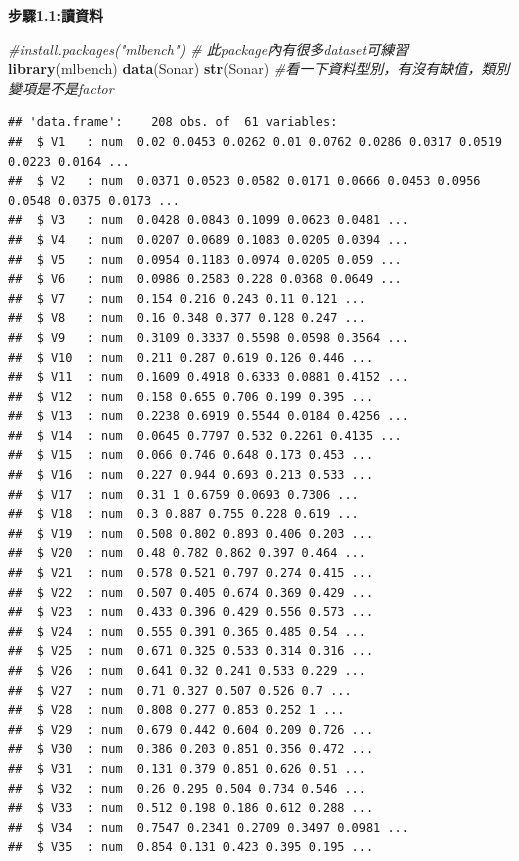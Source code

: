\documentclass[]{book}
\newenvironment{Shaded}{\begin{snugshade}}{\end{snugshade}}
\newcommand{\CommentTok}[1]{\textcolor[rgb]{0.56,0.35,0.01}{\textit{#1}}}
\newcommand{\KeywordTok}[1]{\textcolor[rgb]{0.13,0.29,0.53}{\textbf{#1}}}
\newcommand{\NormalTok}[1]{#1}
\begin{document}
\textbf{步驟1.1:讀資料}

\begin{Shaded}
\begin{Highlighting}[]
\CommentTok{#install.packages("mlbench") # 此package內有很多dataset可練習}
\KeywordTok{library}\NormalTok{(mlbench)}
\KeywordTok{data}\NormalTok{(Sonar)}
\KeywordTok{str}\NormalTok{(Sonar) }\CommentTok{#看一下資料型別，有沒有缺值，類別變項是不是factor}
\end{Highlighting}
\end{Shaded}

\begin{verbatim}
## 'data.frame':    208 obs. of  61 variables:
##  $ V1   : num  0.02 0.0453 0.0262 0.01 0.0762 0.0286 0.0317 0.0519 0.0223 0.0164 ...
##  $ V2   : num  0.0371 0.0523 0.0582 0.0171 0.0666 0.0453 0.0956 0.0548 0.0375 0.0173 ...
##  $ V3   : num  0.0428 0.0843 0.1099 0.0623 0.0481 ...
##  $ V4   : num  0.0207 0.0689 0.1083 0.0205 0.0394 ...
##  $ V5   : num  0.0954 0.1183 0.0974 0.0205 0.059 ...
##  $ V6   : num  0.0986 0.2583 0.228 0.0368 0.0649 ...
##  $ V7   : num  0.154 0.216 0.243 0.11 0.121 ...
##  $ V8   : num  0.16 0.348 0.377 0.128 0.247 ...
##  $ V9   : num  0.3109 0.3337 0.5598 0.0598 0.3564 ...
##  $ V10  : num  0.211 0.287 0.619 0.126 0.446 ...
##  $ V11  : num  0.1609 0.4918 0.6333 0.0881 0.4152 ...
##  $ V12  : num  0.158 0.655 0.706 0.199 0.395 ...
##  $ V13  : num  0.2238 0.6919 0.5544 0.0184 0.4256 ...
##  $ V14  : num  0.0645 0.7797 0.532 0.2261 0.4135 ...
##  $ V15  : num  0.066 0.746 0.648 0.173 0.453 ...
##  $ V16  : num  0.227 0.944 0.693 0.213 0.533 ...
##  $ V17  : num  0.31 1 0.6759 0.0693 0.7306 ...
##  $ V18  : num  0.3 0.887 0.755 0.228 0.619 ...
##  $ V19  : num  0.508 0.802 0.893 0.406 0.203 ...
##  $ V20  : num  0.48 0.782 0.862 0.397 0.464 ...
##  $ V21  : num  0.578 0.521 0.797 0.274 0.415 ...
##  $ V22  : num  0.507 0.405 0.674 0.369 0.429 ...
##  $ V23  : num  0.433 0.396 0.429 0.556 0.573 ...
##  $ V24  : num  0.555 0.391 0.365 0.485 0.54 ...
##  $ V25  : num  0.671 0.325 0.533 0.314 0.316 ...
##  $ V26  : num  0.641 0.32 0.241 0.533 0.229 ...
##  $ V27  : num  0.71 0.327 0.507 0.526 0.7 ...
##  $ V28  : num  0.808 0.277 0.853 0.252 1 ...
##  $ V29  : num  0.679 0.442 0.604 0.209 0.726 ...
##  $ V30  : num  0.386 0.203 0.851 0.356 0.472 ...
##  $ V31  : num  0.131 0.379 0.851 0.626 0.51 ...
##  $ V32  : num  0.26 0.295 0.504 0.734 0.546 ...
##  $ V33  : num  0.512 0.198 0.186 0.612 0.288 ...
##  $ V34  : num  0.7547 0.2341 0.2709 0.3497 0.0981 ...
##  $ V35  : num  0.854 0.131 0.423 0.395 0.195 ...

\end{verbatim}
\end{document}
